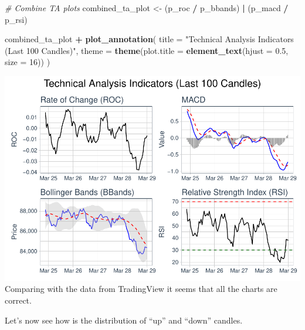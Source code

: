 \documentclass[
]{article}
\newenvironment{Shaded}{\begin{snugshade}}{\end{snugshade}}
\newcommand{\AttributeTok}[1]{\textcolor[rgb]{0.13,0.29,0.53}{#1}}
\newcommand{\CommentTok}[1]{\textcolor[rgb]{0.56,0.35,0.01}{\textit{#1}}}
\newcommand{\DecValTok}[1]{\textcolor[rgb]{0.00,0.00,0.81}{#1}}
\newcommand{\FloatTok}[1]{\textcolor[rgb]{0.00,0.00,0.81}{#1}}
\newcommand{\FunctionTok}[1]{\textcolor[rgb]{0.13,0.29,0.53}{\textbf{#1}}}
\newcommand{\NormalTok}[1]{#1}
\newcommand{\OtherTok}[1]{\textcolor[rgb]{0.56,0.35,0.01}{#1}}
\newcommand{\SpecialCharTok}[1]{\textcolor[rgb]{0.81,0.36,0.00}{\textbf{#1}}}
\newcommand{\StringTok}[1]{\textcolor[rgb]{0.31,0.60,0.02}{#1}}
\begin{document}
\begin{Shaded}
\begin{Highlighting}[]
\CommentTok{\# Combine TA plots}
\NormalTok{combined\_ta\_plot }\OtherTok{\textless{}{-}}\NormalTok{ (p\_roc }\SpecialCharTok{/}\NormalTok{ p\_bbands) }\SpecialCharTok{|}\NormalTok{ (p\_macd }\SpecialCharTok{/}\NormalTok{ p\_rsi)}

\NormalTok{combined\_ta\_plot }\SpecialCharTok{+} \FunctionTok{plot\_annotation}\NormalTok{(}
  \AttributeTok{title =} \StringTok{"Technical Analysis Indicators (Last 100 Candles)"}\NormalTok{,}
  \AttributeTok{theme =} \FunctionTok{theme}\NormalTok{(}\AttributeTok{plot.title =} \FunctionTok{element\_text}\NormalTok{(}\AttributeTok{hjust =} \FloatTok{0.5}\NormalTok{, }\AttributeTok{size =} \DecValTok{16}\NormalTok{))}
\NormalTok{)}
\end{Highlighting}
\end{Shaded}

\includegraphics{REPORT_files/figure-latex/visual_ta-1.pdf} Comparing
with the data from TradingView it seems that all the charts are correct.

Let's now see how is the distribution of ``up'' and ``down'' candles.
\end{document}

